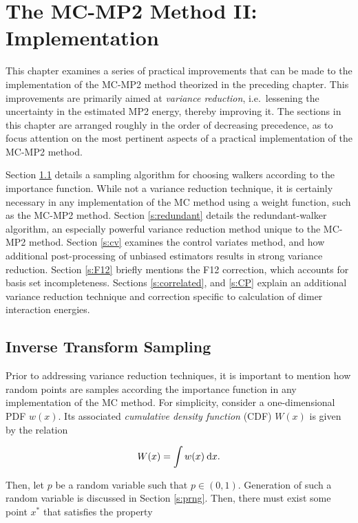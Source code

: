 \chapter{The MC-MP2 Method II: Implementation}

This chapter examines a series of practical improvements that can be made to the
implementation of the MC-MP2 method theorized in the preceding chapter. This
improvements are primarily aimed at \emph{variance reduction}, i.e.\ lessening
the uncertainty in the estimated MP2 energy, thereby improving it. The sections
in this chapter are arranged roughly in the order of decreasing precedence, as
to focus attention on the most pertinent aspects of a practical implementation
of the MC-MP2 method.

Section \ref{s:inverse} details a sampling algorithm for choosing walkers
according to the importance function. While not a variance reduction technique,
it is certainly necessary in any implementation of the MC method using a weight
function, such as the MC-MP2 method. Section \ref{s:redundant} details the
redundant-walker algorithm, an especially powerful variance reduction method
unique to the MC-MP2 method. Section \ref{s:cv} examines the control variates
method, and how additional post-processing of unbiased estimators results in
strong variance reduction. Section \ref{s:F12} briefly mentions the F12
correction, which accounts for basis set incompleteness. Sections
\ref{s:correlated}, and \ref{s:CP} explain an additional variance reduction
technique and correction specific to calculation of dimer interaction energies.

\section{Inverse Transform Sampling}
\label{s:inverse}

Prior to addressing variance reduction techniques, it is important to mention
how random points are samples according the importance function in any
implementation of the MC method. For simplicity, consider a one-dimensional PDF
$w(x)$.  Its associated \emph{cumulative density function} (CDF) $W(x)$ is given
by the relation

\begin{equation}
W(x) = \int w(x) \:\mathrm{d} x.
\end{equation}

Then, let $p$ be a random variable such that $p \in (0, 1)$. Generation of such
a random variable is discussed in Section \ref{s:prng}. Then, there must exist
some point $x^*$ that satisfies the property

